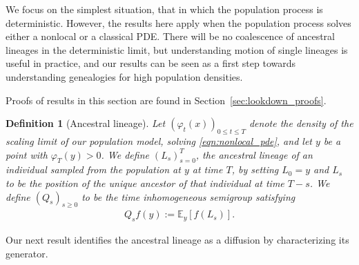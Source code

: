 \documentclass[12pt]{article}
\newtheorem{definition}[theorem]{Definition}
\newcommand{\IE}{\mathbb E}
\numberwithin{equation}{section}
\begin{document}
We focus on the simplest situation, that in which the population process is deterministic.
However, the results here apply when the population process solves 
either a nonlocal or a classical PDE.
There will be no 
coalescence of ancestral lineages in the deterministic limit,
but understanding motion of single lineages is useful in practice,
and our results can
be seen as a first step towards understanding genealogies for high population densities. 

Proofs of results in this section are found in Section~\ref{sec:lookdown_proofs}.

\begin{definition}[Ancestral lineage] 
\label{def:lineage_generator}
    Let $(\varphi_t(x))_{0 \le t \le T}$
    denote the density of the scaling limit of our population model, 
solving \eqref{eqn:nonlocal_pde},
    and let $y$ be a point with $\varphi_T(y) > 0$.
    We define $(L_s)_{s=0}^T$,
    the ancestral lineage of an individual sampled from the
population at $y$ at time $T$, by setting $L_0=y$ and $L_s$
    to be the position of the unique ancestor of that individual at time $T - s$.
    We define
    $(Q_s)_{s \geq 0}$
    to be the time inhomogeneous semigroup satisfying
    \begin{align*}
        Q_s f(y) := \IE_y[ f(L_s) ] .
    \end{align*}
\end{definition}

Our next result identifies the ancestral lineage as a diffusion
by characterizing its generator.
\end{document}
